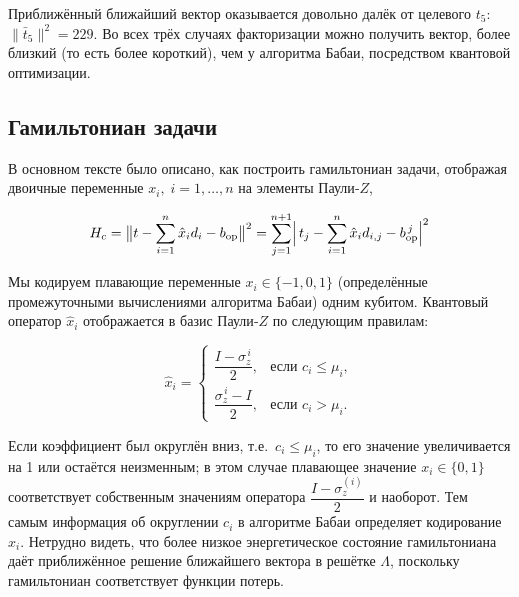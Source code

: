 Приближённый ближайший вектор оказывается довольно далёк от целевого \(t_{5}\):
\(\lVert\bar t_{5}\rVert^{2}=229\). Во всех трёх случаях факторизации можно
получить вектор, более близкий (то есть более короткий), чем у алгоритма Бабаи,
посредством квантовой оптимизации.

\subsection*{Гамильтониан задачи}

В основном тексте было описано, как построить гамильтониан задачи, отображая
двоичные переменные $x_i,\; i = 1,\dots,n$ на элементы Паули‑$Z$,

\begin{equation}
H_{c}
  = \bigl\lVert t - \sum_{i=1}^{n} \hat x_{i} d_{i} - b_{\mathrm{op}}\bigr\rVert^{2}
  = \sum_{j=1}^{n+1} \Bigl|\, t_{j} - \sum_{i=1}^{n} \hat x_{i} d_{i,j}
           - b^{\,j}_{\mathrm{op}} \Bigr|^{2}
\end{equation}

Мы кодируем плавающие переменные $x_i\in\{-1,0,1\}$ (определённые
промежуточными вычислениями алгоритма Бабаи) одним кубитом. Квантовый оператор
$\hat x_i$ отображается в базис Паули‑$Z$ по следующим правилам:

\begin{equation}
\hat x_{i} =
\begin{cases}
\dfrac{I - \sigma^{\,i}_{z}}{2}, & \text{если } c_{i} \le \mu_{i},\\[6pt]
\dfrac{\sigma^{\,i}_{z} - I}{2}, & \text{если } c_{i} > \mu_{i}.
\end{cases}
\end{equation}

Если коэффициент был округлён вниз, т.е.\ $c_i\le\mu_i$, то его значение
увеличивается на 1 или остаётся неизменным; в этом случае плавающее значение
$x_i\in\{0,1\}$ соответствует собственным значениям оператора
$\dfrac{I-\sigma_z^{(i)}}{2}$ и наоборот. Тем самым информация об округлении
$c_i$ в алгоритме Бабаи определяет кодирование $x_i$. Нетрудно видеть, что
более низкое энергетическое состояние гамильтониана даёт приближённое решение
ближайшего вектора в решётке $\Lambda$, поскольку гамильтониан соответствует
функции потерь.

